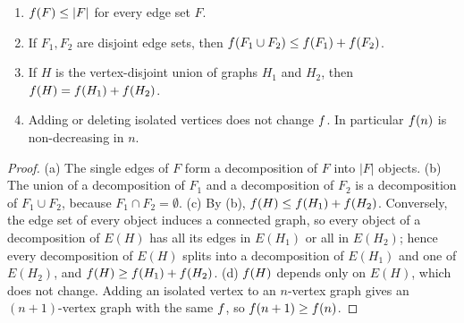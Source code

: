\begin{fact}\label{s1:factAdd}
\begin{enumerate}
\item[(a)] $f(F)\le|F|$ for every edge set $F$.
\item[(b)] If $F_1,F_2$ are disjoint edge sets, then $f(F_1\cup F_2)\le
f(F_1)+f(F_2)$.
\item[(c)] If $H$ is the vertex-disjoint union of graphs $H_1$ and $H_2$, then
$f(H)=f(H_1)+f(H_2)$.
\item[(d)] Adding or deleting isolated vertices does not change $f$. In
particular $f(n)$ is non-decreasing in $n$.
\end{enumerate}
\end{fact}
\begin{proof}
(a) The single edges of $F$ form a decomposition of $F$ into $|F|$ objects.
(b) The union of a decomposition of $F_1$ and a decomposition of $F_2$ is a
decomposition of $F_1\cup F_2$, because $F_1\cap F_2=\emptyset$.
(c) By (b), $f(H)\le f(H_1)+f(H_2)$. Conversely, the edge set of every object
induces a connected graph, so every object of a decomposition of $E(H)$ has all
its edges in $E(H_1)$ or all in $E(H_2)$; hence every decomposition of $E(H)$
splits into a decomposition of $E(H_1)$ and one of $E(H_2)$, and
$f(H)\ge f(H_1)+f(H_2)$.
(d) $f(H)$ depends only on $E(H)$, which does not change. Adding an isolated
vertex to an $n$-vertex graph gives an $(n+1)$-vertex graph with the same $f$,
so $f(n+1)\ge f(n)$.
\end{proof}

